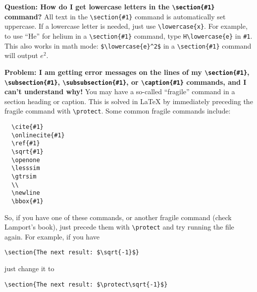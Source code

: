 {\bf Question: How do I get lowercase letters in the \verb+\section{#1}+
command?} All text in the \verb+\section{#1}+ command is automatically set
uppercase. If a lowercase letter is needed, just use \verb+\lowercase{x}+.
For example, to use ``He'' for helium in a \verb+\section{#1}+ command,
type \verb+H\lowercase{e}+ in \verb+#1+. This also works in math mode:
\verb+$\lowercase{e}^2$+ in a \verb+\section{#1}+ command will output
$e^2$.

{\bf Problem: I am getting error messages on the lines of my
\verb+\section{#1}+,
\verb+\subsection{#1}+,
\verb+\subsubsection{#1}+, or
\verb+\caption{#1}+ commands, and I can't understand why!}
You may have a so-called ``fragile'' command in a section heading or
caption. This is solved in \LaTeX{} by immediately preceding the fragile
command with \verb+\protect+. Some common fragile commands include:
\begin{verbatim}
  \cite{#1}
  \onlinecite{#1}
  \ref{#1}
  \sqrt{#1}
  \openone
  \lesssim
  \gtrsim
  \\
  \newline
  \bbox{#1}
\end{verbatim}
So, if you have one of these commands, or another fragile command (check
Lamport's book), just precede them with \verb+\protect+ and try running
the file again.
For example, if you have
\begin{verbatim}
\section{The next result: $\sqrt{-1}$}
\end{verbatim}
just change it to
\begin{verbatim}
\section{The next result: $\protect\sqrt{-1}$}
\end{verbatim}


